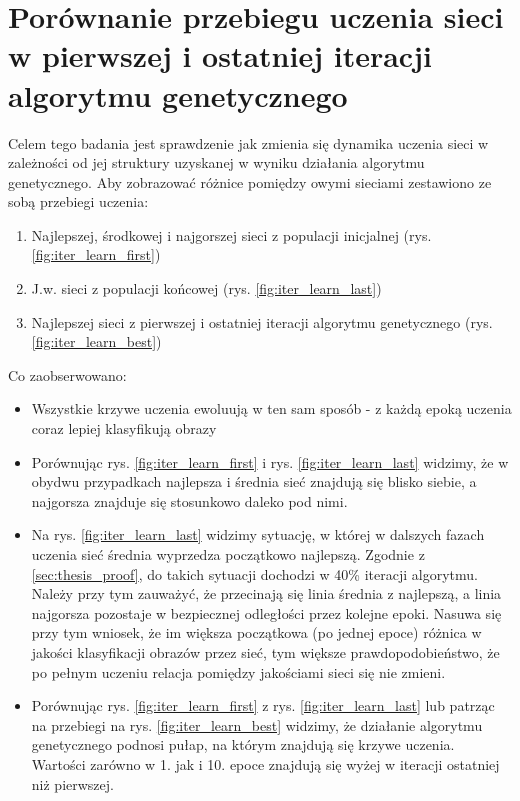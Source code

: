 \section{Porównanie przebiegu uczenia sieci w pierwszej i ostatniej iteracji algorytmu genetycznego}
Celem tego badania jest sprawdzenie jak zmienia się dynamika uczenia sieci w zależności od jej struktury uzyskanej w wyniku działania algorytmu genetycznego.
Aby zobrazować różnice pomiędzy owymi sieciami zestawiono ze sobą przebiegi uczenia:
\begin{enumerate}
  \item Najlepszej, środkowej i najgorszej sieci z populacji inicjalnej (rys. \ref{fig:iter_learn_first})
  \item J.w. sieci z populacji końcowej (rys. \ref{fig:iter_learn_last})
  \item Najlepszej sieci z pierwszej i ostatniej iteracji algorytmu genetycznego (rys. \ref{fig:iter_learn_best})
\end{enumerate}
Co zaobserwowano:
\begin{itemize}
  \item Wszystkie krzywe uczenia ewoluują w ten sam sposób - z każdą epoką uczenia coraz lepiej klasyfikują obrazy
  \item Porównując rys. \ref{fig:iter_learn_first} i rys. \ref{fig:iter_learn_last} widzimy, że w obydwu przypadkach najlepsza i średnia sieć znajdują się blisko siebie, a najgorsza znajduje się stosunkowo daleko pod nimi.
  \item Na rys. \ref{fig:iter_learn_last} widzimy sytuację, w której w dalszych fazach uczenia sieć średnia wyprzedza początkowo najlepszą.
  Zgodnie z \ref{sec:thesis_proof}, do takich sytuacji dochodzi w 40\% iteracji algorytmu.
  Należy przy tym zauważyć, że przecinają się linia średnia z najlepszą, a linia najgorsza pozostaje w bezpiecznej odległości przez kolejne epoki.
  Nasuwa się przy tym wniosek, że im większa początkowa (po jednej epoce) różnica w jakości klasyfikacji obrazów przez sieć, tym większe prawdopodobieństwo, że po pełnym uczeniu relacja pomiędzy jakościami sieci się nie zmieni.
  \item Porównując rys. \ref{fig:iter_learn_first} z rys. \ref{fig:iter_learn_last} lub patrząc na przebiegi na rys. \ref{fig:iter_learn_best} widzimy, że działanie algorytmu genetycznego podnosi pułap, na którym znajdują się krzywe uczenia.
  Wartości zarówno w 1. jak i 10. epoce znajdują się wyżej w iteracji ostatniej niż pierwszej.

\end{itemize}

